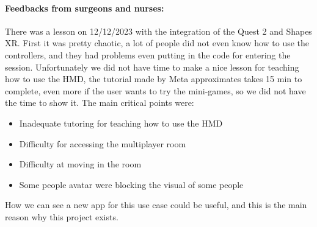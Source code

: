 \paragraph{Feedbacks from surgeons and nurses:}

There was a lesson on 12/12/2023 with the integration of the Quest 2 and Shapes XR. First it was pretty chaotic, a lot of people did not even know how to use the controllers,
and they had problems even putting in the code for entering the session. Unfortunately we did not have time to make a nice lesson for teaching how to use the HMD,
the tutorial made by Meta approximates takes 15 min to complete, even more if the user wants to try the mini-games, so we did not have the time to show it. The main critical points were: 

\begin{itemize}
  \item Inadequate tutoring for teaching how to use the \ac{HMD}
  \item Difficulty for accessing the multiplayer room
  \item Difficulty at moving in the room
  \item Some people avatar were blocking the visual of some people
\end{itemize}
\noindent
How we can see a new app for this use case could be useful, and this is the main reason why this project exists. 